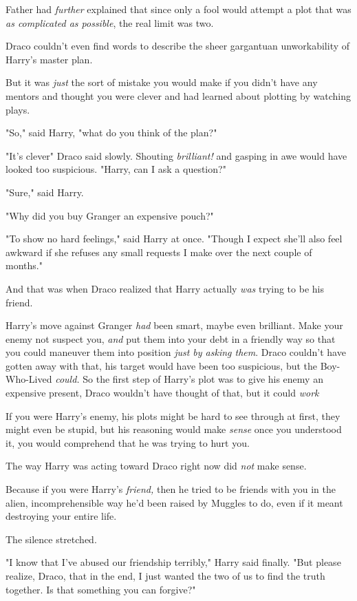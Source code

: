 Father had \emph{further} explained that since only a fool would attempt a plot
that was \emph{as complicated as possible}, the real limit was two.

Draco couldn't even find words to describe the sheer gargantuan unworkability
of Harry's master plan.

But it was \emph{just} the sort of mistake you would make if you didn't have
any mentors and thought you were clever and had learned about plotting by
watching plays.

"So," said Harry, "what do you think of the plan?"

"It's clever{\el}" Draco said slowly. Shouting \emph{brilliant!} and gasping
in awe would have looked too suspicious. "Harry, can I ask a question?"

"Sure," said Harry.

"Why did you buy Granger an expensive pouch?"

"To show no hard feelings," said Harry at once. "Though I expect she'll also
feel awkward if she refuses any small requests I make over the next couple of
months."

And that was when Draco realized that Harry actually \emph{was} trying to be
his friend.

Harry's move against Granger \emph{had} been smart, maybe even brilliant. Make
your enemy not suspect you, \emph{and} put them into your debt in a friendly
way so that you could maneuver them into position \emph{just by asking them}.
Draco couldn't have gotten away with that, his target would have been too
suspicious, but the Boy-Who-Lived \emph{could.} So the first step of Harry's
plot was to give his enemy an expensive present, Draco wouldn't have thought of
that, but it could \emph{work{\el}}

If you were Harry's enemy, his plots might be hard to see through at first,
they might even be stupid, but his reasoning would make \emph{sense} once you
understood it, you would comprehend that he was trying to hurt you.

The way Harry was acting toward Draco right now did \emph{not} make sense.

Because if you were Harry's \emph{friend,} then he tried to be friends with you
in the alien, incomprehensible way he'd been raised by Muggles to do, even if
it meant destroying your entire life.

The silence stretched.

"I know that I've abused our friendship terribly," Harry said finally. "But
please realize, Draco, that in the end, I just wanted the two of us to find the
truth together. Is that something you can forgive?"


